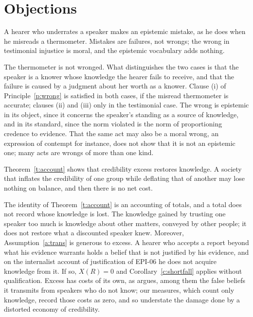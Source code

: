 \documentclass{situationist-preprint}
\begin{document}
\section{Objections}

\begin{objection}\label{o:error}
A hearer who underrates a speaker makes an epistemic mistake, as he does when he misreads a thermometer. Mistakes are failures, not wrongs; the wrong in testimonial injustice is moral, and the epistemic vocabulary adds nothing.
\end{objection}

\begin{reply}
The thermometer is not wronged. What distinguishes the two cases is that the speaker is a knower whose knowledge the hearer fails to receive, and that the failure is caused by a judgment about her worth as a knower. Clause (i) of Principle~\ref{p:wrong} is satisfied in both cases, if the misread thermometer is accurate; clauses (ii) and (iii) only in the testimonial case. The wrong is epistemic in its object, since it concerns the speaker's standing as a source of knowledge, and in its standard, since the norm violated is the norm of proportioning credence to evidence. That the same act may also be a moral wrong, an expression of contempt for instance, does not show that it is not an epistemic one; many acts are wrongs of more than one kind.
\end{reply}

\begin{objection}\label{o:excess}
Theorem~\ref{t:account} shows that credibility excess restores knowledge. A society that inflates the credibility of one group while deflating that of another may lose nothing on balance, and then there is no net cost.
\end{objection}

\begin{reply}
The identity of Theorem~\ref{t:account} is an accounting of totals, and a total does not record whose knowledge is lost. The knowledge gained by trusting one speaker too much is knowledge about other matters, conveyed by other people; it does not restore what a discounted speaker knew. Moreover, Assumption~\ref{a:trans} is generous to excess. A hearer who accepts a report beyond what his evidence warrants holds a belief that is not justified by his evidence, and on the internalist account of justification of EPI-06 he does not acquire knowledge from it. If so, $X(R) = 0$ and Corollary~\ref{c:shortfall} applies without qualification. Excess has costs of its own, as \citet{Medina2013} argues, among them the false beliefs it transmits from speakers who do not know; our measures, which count only knowledge, record those costs as zero, and so understate the damage done by a distorted economy of credibility.
\end{reply}
\end{document}
